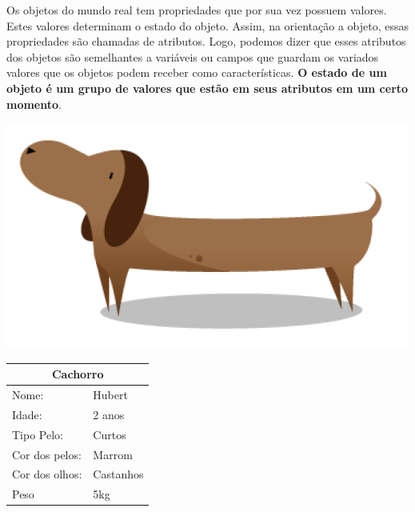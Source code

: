 Os objetos do mundo real tem propriedades que por sua vez possuem valores. 
Estes valores determinam o estado do objeto. Assim, na orientação a objeto, 
essas propriedades são chamadas de atributos. Logo, podemos dizer que esses atributos dos objetos são semelhantes a variáveis ou campos que
guardam os variados valores que os objetos podem receber como características.
\textbf{O estado de um objeto é um grupo de valores que estão em seus atributos em um
certo momento}. \\

\begin{minipage}{\textwidth}
  \begin{minipage}[b]{0.49\textwidth}
    \centering
    \includegraphics[scale=0.4]{imagens/cachorro-objeto.png}
    \label{fig:cachorro-objeto-1}
  \end{minipage}
  \hfill
  \begin{minipage}[b]{0.52\textwidth}
    \centering
    \begin{tabular}{|l|l|}
      \hline
      \multicolumn{2}{|c|}{Cachorro}      \\ \hline
        Nome:                 & Hubert    \\ \hline
        Idade:                & 2 anos    \\ \hline
        Tipo Pelo:            & Curtos    \\ \hline
        Cor dos pelos:        & Marrom    \\ \hline
        Cor dos olhos:        & Castanhos \\ \hline
        Peso                  & 5kg       \\ \hline
      \end{tabular}
    \end{minipage}
  \end{minipage} \\

